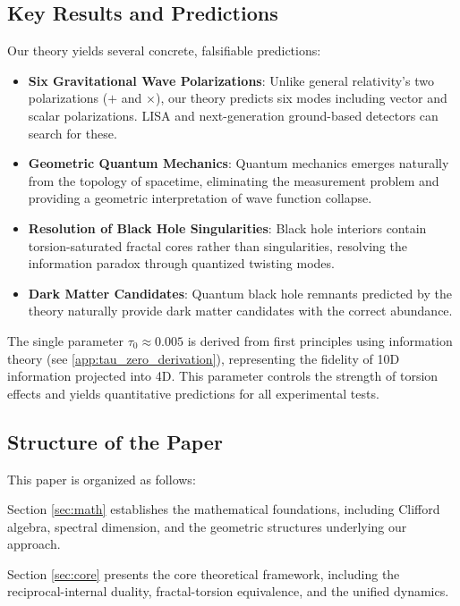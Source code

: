 \subsection{Key Results and Predictions}

Our theory yields several concrete, falsifiable predictions:

\begin{itemize}
    \item \textbf{Six Gravitational Wave Polarizations}: Unlike general relativity's two polarizations ($+$ and $\times$), our theory predicts six modes including vector and scalar polarizations. LISA and next-generation ground-based detectors can search for these.
    
    \item \textbf{Geometric Quantum Mechanics}: Quantum mechanics emerges naturally from the topology of spacetime, eliminating the measurement problem and providing a geometric interpretation of wave function collapse.
    
    \item \textbf{Resolution of Black Hole Singularities}: Black hole interiors contain torsion-saturated fractal cores rather than singularities, resolving the information paradox through quantized twisting modes.
    
    \item \textbf{Dark Matter Candidates}: Quantum black hole remnants predicted by the theory naturally provide dark matter candidates with the correct abundance.
\end{itemize}

The single parameter $\tau_0 \approx 0.005$ is derived from first principles using information theory (see \cref{app:tau_zero_derivation}), representing the fidelity of 10D information projected into 4D. This parameter controls the strength of torsion effects and yields quantitative predictions for all experimental tests.

\subsection{Structure of the Paper}

This paper is organized as follows:

Section \ref{sec:math} establishes the mathematical foundations, including Clifford algebra, spectral dimension, and the geometric structures underlying our approach.

Section \ref{sec:core} presents the core theoretical framework, including the reciprocal-internal duality, fractal-torsion equivalence, and the unified dynamics.

